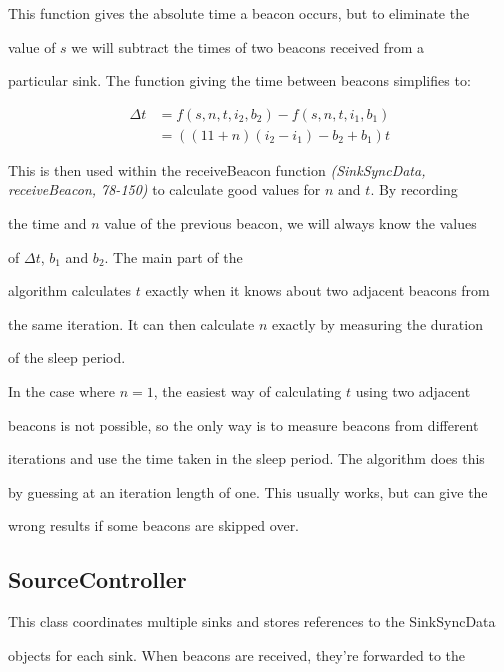 \documentclass[a4paper,12pt,DIV=calc]{scrartcl}
\newcommand{\coderef}[3]{\emph{(#1, #2, #3)}}
\begin{document}
This function gives the absolute time a beacon occurs, but to eliminate the

value of $s$ we will subtract the times of two beacons received from a

particular sink. The function giving the time between beacons simplifies to:

\begin{align*}

  \Delta t &= f(s, n, t, i_2, b_2) - f(s, n, t, i_1, b_1) \\

           &= ((11 + n)(i_2 - i_1) - b_2 + b_1)t

\end{align*}



This is then used within the receiveBeacon function \coderef{SinkSyncData}

{receiveBeacon}{78-150} to calculate good values for $n$ and $t$. By recording

the time and $n$ value of the previous beacon, we will always know the values

of $\Delta t$, $b_1$ and $b_2$. The main part of the

algorithm calculates $t$ exactly when it knows about two adjacent beacons from

the same iteration. It can then calculate $n$ exactly by measuring the duration

of the sleep period.



In the case where $n = 1$, the easiest way of calculating $t$ using two adjacent

beacons is not possible, so the only way is to measure beacons from different

iterations and use the time taken in the sleep period. The algorithm does this

by guessing at an iteration length of one. This usually works, but can give the

wrong results if some beacons are skipped over.



\subsection{SourceController}

This class coordinates multiple sinks and stores references to the SinkSyncData

objects for each sink.  When beacons are received, they're forwarded to the
\end{document}
